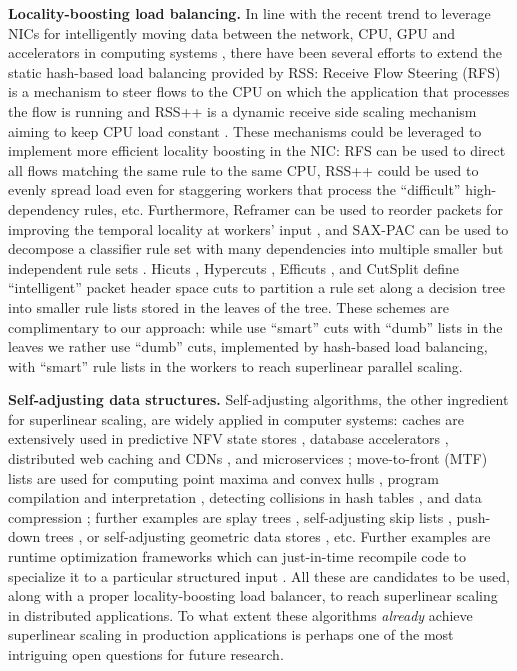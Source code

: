 \noindent%
\textbf{Locality-boosting load balancing.} %
In line with the recent trend to leverage NICs for intelligently moving data between the network, CPU, GPU and accelerators in computing systems \cite{sherry-ccr23}, there have been several efforts to extend the static hash-based load balancing provided by RSS: Receive Flow Steering (RFS) is a mechanism to steer flows to the CPU on which the application that processes the flow is running \cite{rss-linux} and RSS++ is a dynamic receive side scaling mechanism aiming to keep CPU load constant \cite{10.1145/3359989.3365412}. These mechanisms could be leveraged to implement more efficient locality boosting in the NIC: RFS can be used to direct all flows matching the same rule to the same CPU, RSS++ could be used to evenly spread load even for staggering workers that process the ``difficult'' high-dependency rules, etc. Furthermore, Reframer can be used to reorder packets for improving the temporal locality at workers' input \cite{276946,246322}, and SAX-PAC can be used to decompose a classifier rule set with many dependencies into multiple smaller but independent rule sets \cite{10.1145/2619239.2626294}.  Hicuts \cite{820051}, Hypercuts \cite{10.1145/863955.863980}, Efficuts \cite{10.1145/1851182.1851208}, and CutSplit \cite{8485947} define ``intelligent'' packet header space cuts \cite{180587} to partition a rule set along a decision tree into smaller rule lists stored in the leaves of the tree. These schemes are complimentary to our approach: while \cite{820051, 10.1145/863955.863980, 10.1145/1851182.1851208, 8485947} use ``smart'' cuts with ``dumb'' lists in the leaves we rather use ``dumb'' cuts, implemented by hash-based load balancing, with ``smart'' rule lists in the workers to reach superlinear parallel scaling.

\noindent%
\textbf{Self-adjusting data structures.} %
Self-adjusting algorithms, the other ingredient for superlinear scaling, are widely applied in computer systems: caches are extensively used in predictive NFV state stores \cite{295537}, database accelerators \cite{10.5555/1012889.1012894, 180324, ghigoff2021bmc}, distributed web caching and CDNs \cite{295603}, and microservices \cite{295493}; move-to-front (MTF) lists are used for computing point maxima and convex hulls \cite{BentleyCL93}, program compilation and interpretation \cite{HesterH85}, detecting collisions in hash tables \cite{HesterH85}, and data compression \cite{BentleySTW86}; further examples are splay trees \cite{SleatorT85Splay}, self-adjusting skip lists \cite{BoseDL08}, push-down trees \cite{Avin0020}, or self-adjusting geometric data stores \cite{ParkM12}, etc. Further examples are runtime optimization frameworks which can just-in-time recompile code to specialize it to a particular structured input \cite{276946,246322,10.1145/3503222.3507769,procieee_2019}.  All these are candidates to be used, along with a proper locality-boosting load balancer, to reach superlinear scaling in distributed applications.  To what extent these algorithms \emph{already} achieve superlinear scaling in production applications is perhaps one of the most intriguing open questions for future research.
  
